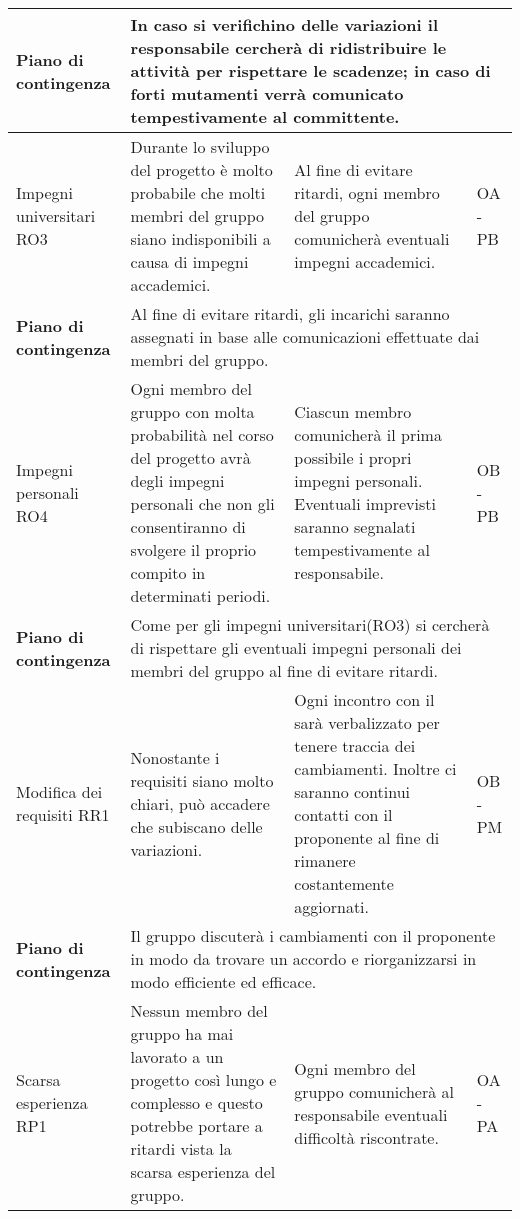 \begin{center}
\begin{longtable}{|p{}|p{}|p{}|p{}|}
		\hline
		\centering \textbf{Piano di contingenza} & \multicolumn{3}{p{0.84\textwidth}}{In caso si verifichino delle variazioni il responsabile cercherà di ridistribuire le attività per rispettare le scadenze; in caso di forti mutamenti verrà comunicato tempestivamente al committente.  } \\
		\hline
		\centering Impegni universitari RO3& Durante lo sviluppo del progetto è molto probabile che molti membri del gruppo siano indisponibili a causa di impegni accademici.  &Al fine di evitare ritardi, ogni membro del gruppo comunicherà eventuali impegni accademici. & OA - PB \\
		\hline 
		\centering \textbf{Piano di contingenza} & \multicolumn{3}{p{0.84\textwidth}}{Al fine di evitare ritardi, gli incarichi saranno assegnati in base alle comunicazioni effettuate dai membri del gruppo.} \\
		\hline
		\centering Impegni personali RO4& Ogni membro del gruppo con molta probabilità nel corso del progetto avrà degli impegni personali che non gli consentiranno di svolgere il proprio compito in determinati periodi. & Ciascun membro comunicherà il prima possibile i propri impegni personali. Eventuali imprevisti saranno segnalati tempestivamente al responsabile. & OB - PB \\
		\hline
		\centering \textbf{Piano di contingenza} & \multicolumn{3}{p{0.84\textwidth}}{Come per gli impegni universitari(RO3) si cercherà di rispettare gli eventuali impegni personali dei membri del gruppo al fine di evitare ritardi.} \\
		\hline
		\centering Modifica dei requisiti RR1& Nonostante i requisiti siano molto chiari, può accadere che subiscano delle variazioni.  & Ogni incontro con il \glock{proponente} sarà verbalizzato per tenere traccia dei cambiamenti. Inoltre ci saranno continui contatti con il proponente al fine di rimanere costantemente aggiornati. & OB - PM \\
		\hline
		\centering \textbf{Piano di contingenza} & \multicolumn{3}{p{0.84\textwidth}}{Il gruppo discuterà i cambiamenti con il proponente in modo da trovare un accordo e riorganizzarsi in modo efficiente ed efficace.} \\
		\hline
		\centering Scarsa esperienza RP1& Nessun membro del gruppo ha mai lavorato a un progetto così lungo e complesso e questo potrebbe portare a ritardi vista la scarsa esperienza del gruppo. & Ogni membro del gruppo comunicherà al responsabile eventuali difficoltà riscontrate. & OA - PA \\

\end{longtable}
\end{center}
